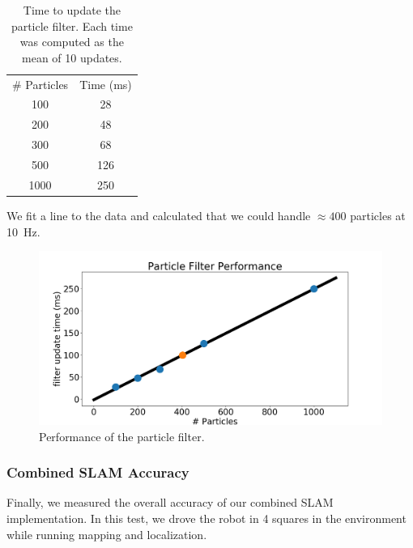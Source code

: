 \documentclass[journal]{IEEEtran}
\begin{document}
            \begin{table}[t]
                \centering
                \begin{tabular}{|c|c|} \hline
                     \# Particles & Time (ms) \\
                     100 & 28 \\ \hline
                     200 & 48 \\ \hline
                     300 & 68 \\ \hline
                     500 & 126 \\ \hline
                     1000 & 250 \\ \hline
                \end{tabular}
                \caption{Time to update the particle filter. Each time was computed as the mean of 10 updates.}
                \label{tab:filter_perf}
            \end{table}
            
            We fit a line to the data and calculated that we could handle $\approx400$ particles at \SI{10}{\hertz}.
        
            \begin{figure}[b]
                \centering
                \includegraphics[width=1\linewidth]{filter_perf.png}
                \caption{Performance of the particle filter.}
                \label{fig:perf}
            \end{figure}
            
        \subsubsection{Combined SLAM Accuracy}
        
        
            Finally, we measured the overall accuracy of our combined SLAM implementation. In this test, we drove the robot in 4 squares in the environment while running mapping and localization.
            
\end{document}
